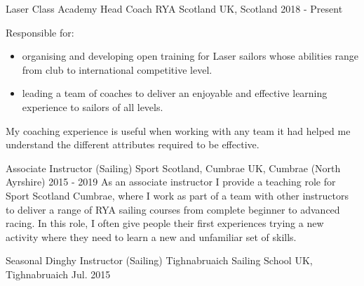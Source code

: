 \begin{cventries}
  \cventry
    {Laser Class Academy Head Coach} %
    {RYA Scotland} %
    {UK, Scotland} %
    {2018 - Present} %
    {
    Responsible for:
    \begin{itemize}
        \item organising and developing open training for Laser sailors whose abilities range from club to international competitive level.
        \item leading a team of coaches to deliver an enjoyable and effective learning experience to sailors of all levels.
    \end{itemize}
    My coaching experience is useful when working with any team it had helped me understand the different attributes required to be effective.
    }

 
  \cventry
    {Associate Instructor (Sailing)} %
    {Sport Scotland, Cumbrae} %
    {UK, Cumbrae (North Ayrshire)} %
    {2015 - 2019} %
    {
      As an associate instructor I provide a teaching role for Sport Scotland Cumbrae, where I work as part of a team with other instructors to deliver a range of RYA sailing courses from complete beginner to advanced racing. In this role, I often give people their first experiences trying a new activity where they need to learn a new and unfamiliar set of skills.
    }

 \cventry
    {Seasonal Dinghy Instructor (Sailing)} %
    {Tighnabruaich Sailing School} %
    {UK, Tighnabruaich} %
    {Jul. 2015} %
    {
    }

\end{cventries}
